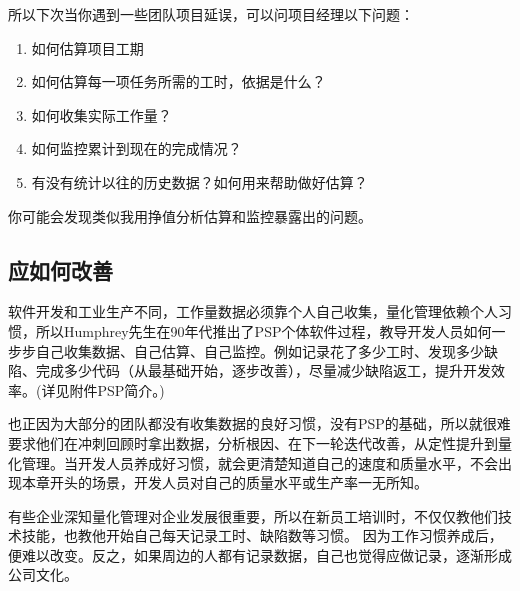所以下次当你遇到一些团队项目延误，可以问项目经理以下问题：

\begin{enumerate}
\tightlist
\item
  如何估算项目工期\\
\item
  如何估算每一项任务所需的工时，依据是什么？\\
\item
  如何收集实际工作量？\\
\item
  如何监控累计到现在的完成情况？\\
\item
  有没有统计以往的历史数据？如何用来帮助做好估算？\\
\end{enumerate}

你可能会发现类似我用挣值分析估算和监控暴露出的问题。

\hypertarget{ux5e94ux8be5ux5982ux4f55ux6539ux5584}{%
\subsection{应如何改善}\label{ux5e94ux8be5ux5982ux4f55ux6539ux5584}}

软件开发和工业生产不同，工作量数据必须靠个人自己收集，量化管理依赖个人习惯，所以Humphrey先生在90年代推出了PSP个体软件过程，教导开发人员如何一步步自己收集数据、自己估算、自己监控。例如记录花了多少工时、发现多少缺陷、完成多少代码（从最基础开始，逐步改善），尽量减少缺陷返工，提升开发效率。(详见附件PSP简介。)

也正因为大部分的团队都没有收集数据的良好习惯，没有PSP的基础，所以就很难要求他们在冲刺回顾时拿出数据，分析根因、在下一轮迭代改善，从定性提升到量化管理。当开发人员养成好习惯，就会更清楚知道自己的速度和质量水平，不会出现本章开头的场景，开发人员对自己的质量水平或生产率一无所知。

有些企业深知量化管理对企业发展很重要，所以在新员工培训时，不仅仅教他们技术技能，也教他开始自己每天记录工时、缺陷数等习惯。
因为工作习惯养成后，便难以改变。反之，如果周边的人都有记录数据，自己也觉得应做记录，逐渐形成公司文化。

